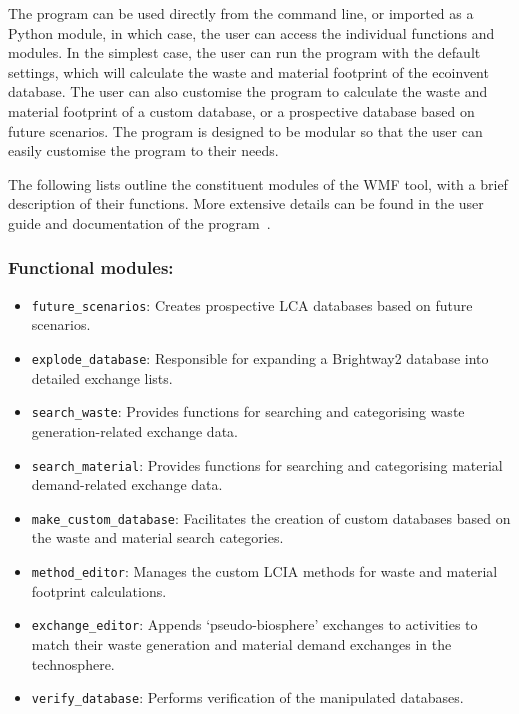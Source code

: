 The program can be used directly from the command line, or imported as a Python module, in which case, the user can access the individual functions and modules. In the simplest case, the user can run the program with the default settings, which will calculate the waste and material footprint of the ecoinvent database. The user can also customise the program to calculate the waste and material footprint of a custom database, or a prospective database based on future scenarios. The program is designed to be modular so that the user can easily customise the program to their needs.

The following lists outline the constituent modules of the WMF tool, with a brief description of their functions. More extensive details can be found in the user guide and documentation of the program~\citep{mcdowall2023wmfdocs}.

\subsubsection{Functional modules:}
\begin{itemize}
    \item \texttt{future\_scenarios}: Creates prospective LCA databases based on future scenarios.
    \item \texttt{explode\_database}: Responsible for expanding a Brightway2 database into detailed exchange lists.
    \item \texttt{search\_waste}: Provides functions for searching and categorising waste generation-related exchange data.
    \item \texttt{search\_material}: Provides functions for searching and categorising material demand-related exchange data.
    \item \texttt{make\_custom\_database}: Facilitates the creation of custom databases based on the waste and material search categories.
    \item \texttt{method\_editor}: Manages the custom LCIA methods for waste and material footprint calculations.
    \item \texttt{exchange\_editor}: Appends `pseudo-biosphere' exchanges to activities to match their waste generation and material demand exchanges in the technosphere.
    \item \texttt{verify\_database}: Performs verification of the manipulated databases.
\end{itemize}

